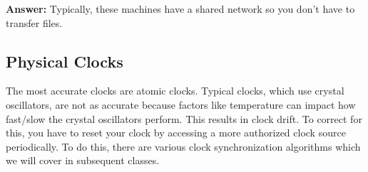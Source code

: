 \documentclass[twoside]{article}
\begin{document}
\textbf{Answer: } Typically, these machines have a shared network so you don't have to transfer files.

\subsection{Physical Clocks}
The most accurate clocks are atomic clocks. Typical clocks, which use crystal oscillators, are not as accurate because factors like temperature can impact how fast/slow the crystal oscillators perform. This results in clock drift. To correct for this, you have to reset your clock by accessing a more authorized clock source periodically. To do this, there are various clock synchronization algorithms which we will cover in subsequent classes.
\end{document}
